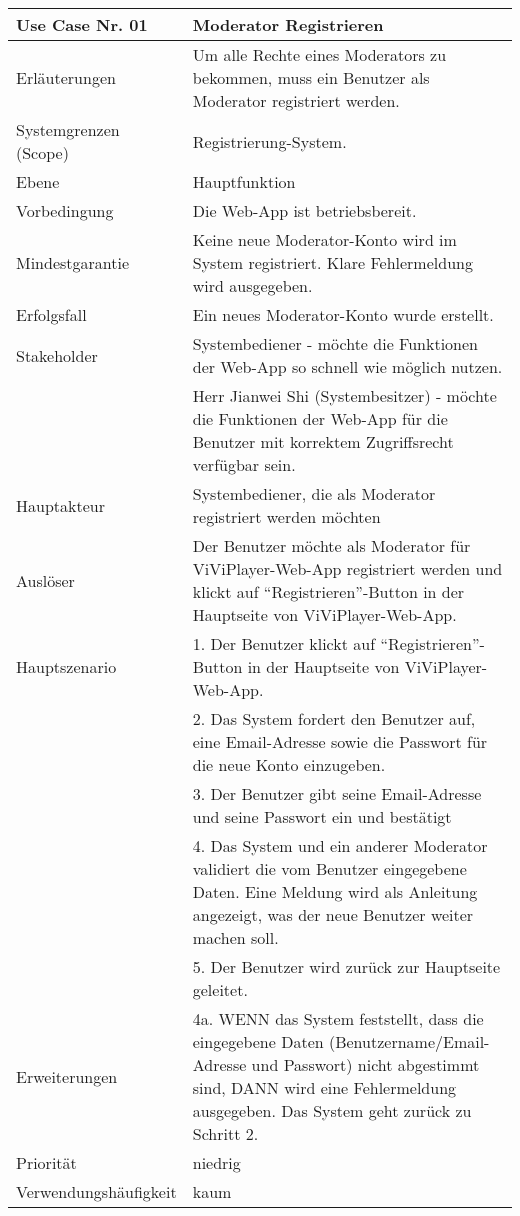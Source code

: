 \begin{tabularx}{\linewidth}{|l|X|}
	\hline
	Use Case Nr. 01			& \textbf{Moderator Registrieren} \\ \hline
	Erläuterungen			& Um alle Rechte eines Moderators zu bekommen, muss ein 
							Benutzer als Moderator registriert werden. \\ \hline
	Systemgrenzen (Scope)	& Registrierung-System. \\ \hline
	Ebene					& Hauptfunktion \\ \hline
	Vorbedingung			& Die Web-App ist betriebsbereit. \\ \hline
	Mindestgarantie			& Keine neue Moderator-Konto wird im System registriert. 
							  Klare Fehlermeldung wird ausgegeben. \\ \hline
	Erfolgsfall  			& Ein neues Moderator-Konto wurde erstellt. \\ \hline
	Stakeholder				& Systembediener - möchte die Funktionen der Web-App so schnell 
							  wie möglich nutzen. \\
							& Herr Jianwei Shi (Systembesitzer) - möchte die Funktionen der 
							  Web-App für die Benutzer mit korrektem Zugriffsrecht verfügbar sein.\\ \hline
	Hauptakteur				& Systembediener, die als Moderator registriert werden möchten \\ 
	                          \hline
	Auslöser				& Der Benutzer möchte als Moderator für ViViPlayer-Web-App 
							  registriert werden und klickt auf ``Registrieren''-Button in der Hauptseite von ViViPlayer-Web-App. \\ \hline	
	Hauptszenario			& 1. Der Benutzer klickt auf ``Registrieren''-Button in der 
							  Hauptseite von ViViPlayer-Web-App. \\
							& 2. Das System fordert den Benutzer auf, eine Email-Adresse 
							  sowie die Passwort für die neue Konto einzugeben. \\
							& 3. Der Benutzer gibt seine Email-Adresse und seine Passwort 
							  ein und bestätigt \\
							& 4. Das System und ein anderer Moderator validiert die vom 
							  Benutzer eingegebene Daten. Eine Meldung wird als 
							  Anleitung angezeigt, was der neue Benutzer weiter machen soll. \\
							& 5. Der Benutzer wird zurück zur Hauptseite geleitet. 
							  \\ \hline
	Erweiterungen			& 4a. WENN das System feststellt, dass die eingegebene Daten 
							  (Benutzername/Email-Adresse und Passwort) nicht abgestimmt sind, DANN wird eine Fehlermeldung ausgegeben. Das System geht zurück zu Schritt 2. \\ \hline
	Priorität				& niedrig \\ \hline
	Verwendungshäufigkeit	& kaum \\ \hline
\end{tabularx}
